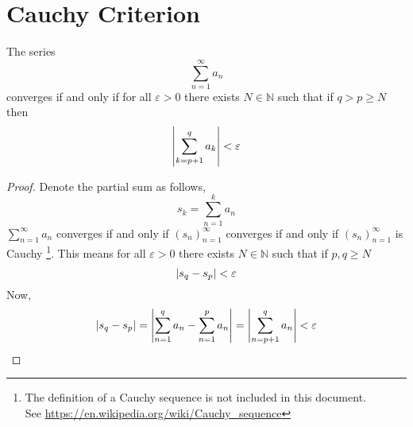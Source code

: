 \documentclass[12pt]{report}
\begin{document}
    \section{Cauchy Criterion}
    \begin{theorem}
        The series
        \[\sum^\infty_{n=1} a_n\]
        converges if and only if for all \(\varepsilon >0\) there exists \(N \in\mathbb{N}\) such that if \(q> p \geq N\) then
        \[\left| \sum^q_{k=p+1} a_k \right| < \varepsilon\]
    \end{theorem}
    \begin{proof}
        Denote the partial sum as follows,
        \[s_k = \sum^k_{n=1} a_n\]
        \(\sum^\infty_{n=1} a_n\) converges if and only if \((s_n)^\infty_{n=1}\) converges if and only if \((s_n)^\infty_{n=1}\) is Cauchy \footnote{The definition of a Cauchy sequence is not included in this document. \\ See \url{https://en.wikipedia.org/wiki/Cauchy_sequence}}. This means for all \(\varepsilon > 0\) there exists \(N \in \mathbb{N}\) such that if \(p,q \geq N\)
        \[\left| s_q - s_p \right| < \varepsilon\]
        Now,
        \[\left| s_q - s_p \right| = \left| \sum^q_{n=1} a_n - \sum^p_{n=1} a_n \right| = \left| \sum^q_{n=p+1} a_n \right| < \varepsilon\]
    \end{proof}
\end{document}
